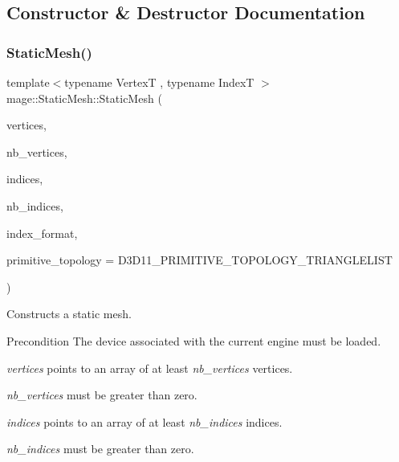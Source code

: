 \subsection{Constructor \& Destructor Documentation}
\hypertarget{classmage_1_1_static_mesh_ad1fb729eb4549c46f357d639127f9724}{}\label{classmage_1_1_static_mesh_ad1fb729eb4549c46f357d639127f9724} 
\subsubsection{\texorpdfstring{Static\+Mesh()}{StaticMesh()}\hspace{0.1cm}{\footnotesize\ttfamily [1/6]}}
{\footnotesize\ttfamily template$<$typename VertexT , typename IndexT $>$ \\
mage\+::\+Static\+Mesh\+::\+Static\+Mesh (\begin{DoxyParamCaption}\item[{const VertexT $\ast$}]{vertices,  }\item[{size\+\_\+t}]{nb\+\_\+vertices,  }\item[{const IndexT $\ast$}]{indices,  }\item[{size\+\_\+t}]{nb\+\_\+indices,  }\item[{D\+X\+G\+I\+\_\+\+F\+O\+R\+M\+AT}]{index\+\_\+format,  }\item[{D3\+D11\+\_\+\+P\+R\+I\+M\+I\+T\+I\+V\+E\+\_\+\+T\+O\+P\+O\+L\+O\+GY}]{primitive\+\_\+topology = {\ttfamily D3D11\+\_\+PRIMITIVE\+\_\+TOPOLOGY\+\_\+TRIANGLELIST} }\end{DoxyParamCaption})\hspace{0.3cm}{\ttfamily [explicit]}}

Constructs a static mesh.

\begin{DoxyPrecond}{Precondition}
The device associated with the current engine must be loaded. 

{\itshape vertices} points to an array of at least {\itshape nb\+\_\+vertices} vertices. 

{\itshape nb\+\_\+vertices} must be greater than zero. 

{\itshape indices} points to an array of at least {\itshape nb\+\_\+indices} indices. 

{\itshape nb\+\_\+indices} must be greater than zero. 
\end{DoxyPrecond}

